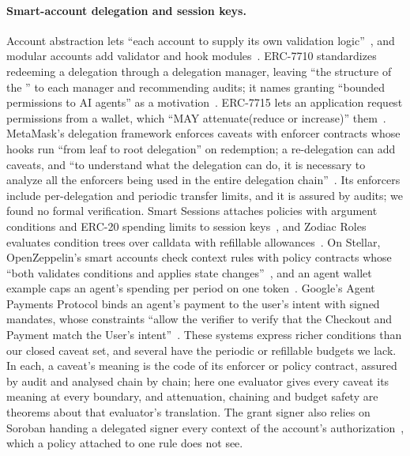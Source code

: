 \paragraph{Smart-account delegation and session keys.} Account
abstraction lets ``each account to supply its own validation
logic''~\cite{erc4337}, and modular accounts add validator and hook
modules~\cite{erc7579}. ERC-7710 standardizes redeeming a delegation through
a delegation manager, leaving ``the structure of the
'' to each manager and recommending audits; it
names granting ``bounded permissions to AI agents'' as a
motivation~\cite{erc7710}. ERC-7715 lets an application request permissions
from a wallet, which ``MAY attenuate(reduce or increase)'' them~\cite{erc7715}.
MetaMask's delegation framework enforces caveats with enforcer contracts whose
hooks run ``from leaf to root delegation'' on redemption; a re-delegation can
add caveats, and ``to understand what the delegation can do, it is necessary to
analyze all the enforcers being used in the entire delegation
chain''~\cite{metamaskDelegation}. Its enforcers include per-delegation and
periodic transfer limits, and it is assured by audits; we found no formal
verification. Smart Sessions attaches policies with argument conditions and
ERC-20 spending limits to session keys~\cite{smartSessions}, and Zodiac Roles
evaluates condition trees over calldata with refillable
allowances~\cite{zodiacRoles}. On Stellar, OpenZeppelin's smart accounts check
context rules with policy contracts whose  ``both validates
conditions and applies state changes''~\cite{ozStellarAccounts}, and an agent
wallet example caps an agent's spending per period on one
token~\cite{ozAgentWallet}. Google's Agent Payments Protocol binds an agent's
payment to the user's intent with signed mandates, whose constraints ``allow
the verifier to verify that the Checkout and Payment match the User's
intent''~\cite{ap2}. These systems express richer conditions than our closed
caveat set, and several have the periodic or refillable budgets we lack. In
each, a caveat's meaning is the code of its enforcer or policy contract,
assured by audit and analysed chain by chain; here one evaluator gives every
caveat its meaning at every boundary, and attenuation, chaining and budget
safety are theorems about that evaluator's translation. The grant signer also
relies on Soroban handing a delegated signer every context of the account's
authorization~\cite{cap7101}, which a policy attached to one rule does not
see.

